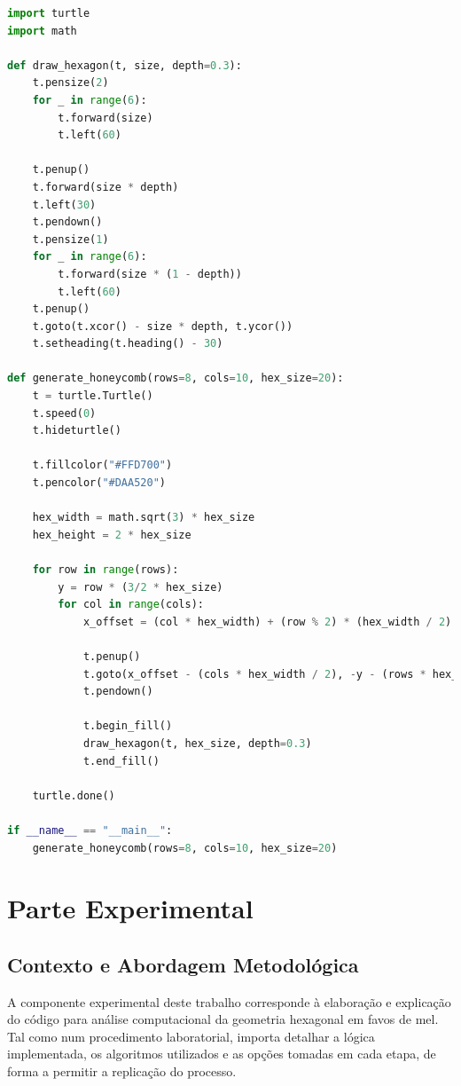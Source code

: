 \documentclass[12pt,a4paper,oneside]{extarticle}
\begin{document}
\begin{lstlisting}[language=python]
import turtle
import math

def draw_hexagon(t, size, depth=0.3):
    t.pensize(2)
    for _ in range(6):
        t.forward(size)
        t.left(60)
    
    t.penup()
    t.forward(size * depth)
    t.left(30)
    t.pendown()
    t.pensize(1)
    for _ in range(6):
        t.forward(size * (1 - depth))
        t.left(60)
    t.penup()
    t.goto(t.xcor() - size * depth, t.ycor())
    t.setheading(t.heading() - 30)

def generate_honeycomb(rows=8, cols=10, hex_size=20):
    t = turtle.Turtle()
    t.speed(0)
    t.hideturtle()
    
    t.fillcolor("#FFD700")
    t.pencolor("#DAA520")
    
    hex_width = math.sqrt(3) * hex_size
    hex_height = 2 * hex_size
    
    for row in range(rows):
        y = row * (3/2 * hex_size)
        for col in range(cols):
            x_offset = (col * hex_width) + (row % 2) * (hex_width / 2)
            
            t.penup()
            t.goto(x_offset - (cols * hex_width / 2), -y - (rows * hex_height / 4))  # Centraliza
            t.pendown()
        
            t.begin_fill()
            draw_hexagon(t, hex_size, depth=0.3)
            t.end_fill()
    
    turtle.done()

if __name__ == "__main__":
    generate_honeycomb(rows=8, cols=10, hex_size=20)
\end{lstlisting}


\section{Parte Experimental}

\subsection{Contexto e Abordagem Metodológica}

A componente experimental deste trabalho corresponde à elaboração e explicação do código para análise computacional da geometria hexagonal em favos de mel. Tal como num procedimento laboratorial, importa detalhar a lógica implementada, os algoritmos utilizados e as opções tomadas em cada etapa, de forma a permitir a replicação do processo.
\end{document}
